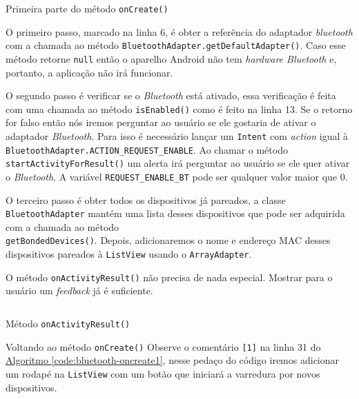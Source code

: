 \documentclass[a4paper,12pt,brazil,oneside]{book}
\begin{document}
\begin{singlespace}
	\begin{listing}[H]
	\inputminted[linenos=true,fontsize=\small,frame=lines, framesep=2mm, tabsize=2,numbersep=5pt]{java}{src/api/bluetooth/oncreate1.java}
	\caption{Primeira parte do método \texttt{onCreate()}}
	\label{code:bluetooth-oncreate1}
	\end{listing} 			

	O primeiro passo, marcado na linha 6, é obter a referência do adaptador \emph{bluetooth} com a chamada ao método \texttt{BluetoothAdapter.getDefaultAdapter()}. Caso esse método retorne \texttt{null} então o aparelho Android não tem \emph{hardware Bluetooth} e, portanto, a aplicação não irá funcionar. 

	O segundo passo é verificar se o \emph{Bluetooth} está ativado, essa verificação é feita com uma chamada ao método \texttt{isEnabled()} como é feito na linha 13. Se o retorno for falso então nós iremos perguntar ao usuário se ele gostaria de ativar o adaptador \emph{Bluetooth}. Para isso é necessário lançar um \texttt{Intent} com \emph{action} igual à \texttt{BluetoothAdapter.ACTION\_REQUEST\_ENABLE}. Ao chamar o método \texttt{startActivityForResult()} um alerta irá perguntar ao usuário se ele quer ativar o \emph{Bluetooth}. A variável \texttt{REQUEST\_ENABLE\_BT} pode ser qualquer valor maior que 0.  

	O terceiro passo é obter todos os dispositivos já pareados, a classe \texttt{BluetoothAdapter} mantém uma lista desses dispositivos que pode ser adquirida com a chamada ao método \\ \texttt{getBondedDevices()}. Depois, adicionaremos o nome e endereço MAC desses dispositivos pareados à \texttt{ListView} usando o \texttt{ArrayAdapter}. 

	O método \texttt{onActivityResult()} não precisa de nada especial. Mostrar para o usuário um \emph{feedback} já é suficiente.

	\begin{listing}[H]
	\inputminted[linenos=true,fontsize=\small,frame=lines, framesep=2mm, tabsize=2,numbersep=5pt]{java}{src/api/bluetooth/onactivityresult.java}
	\caption{Método \texttt{onActivityResult()}}
	\label{code:bluetooth-onactivityresult}
	\end{listing} 			

	Voltando ao método \texttt{onCreate()} Observe o comentário \texttt{[1]} na linha 31 do \hyperref[code:bluetooth-oncreate1]{Algoritmo \ref*{code:bluetooth-oncreate1}}, nesse pedaço do código iremos adicionar um rodapé na \texttt{ListView} com um botão que iniciará a varredura por novos dispositivos.


\end{singlespace}
\end{document}
